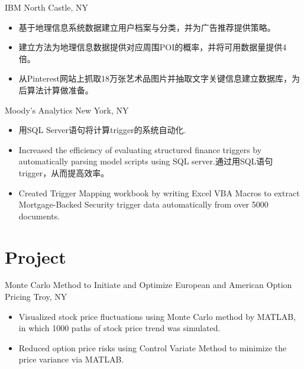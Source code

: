 \documentclass[11pt,a4paper,roman]{moderncv} %
\begin{document}
{IBM}
{North Castle, NY}{}
{\begin{itemize}  %
	\item 基于地理信息系统数据建立用户档案与分类，并为广告推荐提供策略。
	\item 建立方法为地理信息数据提供对应周围POI的概率，并将可用数据量提供4倍。
	\item 从Pinterest网站上抓取18万张艺术品图片并抽取文字关键信息建立数据库，为后算法计算做准备。
\end{itemize}}

{Moody's Analytics}
{New York, NY}{}
{\begin{itemize}  %
	\item 用SQL Server语句将计算trigger的系统自动化. %
	\item Increased the efficiency of evaluating structured finance triggers by automatically parsing model scripts using SQL server.通过用SQL语句trigger，从而提高效率。 %
	\item Created Trigger Mapping workbook by writing Excel VBA Macros to extract Mortgage-Backed Security trigger data automatically from over 5000 documents. %
\end{itemize}}



\section{Project}

{Monte Carlo Method to Initiate and Optimize European and American Option Pricing}
{Troy, NY}{}
{\begin{itemize}  %
    \item Visualized stock price fluctuations using Monte Carlo method by MATLAB, in which 1000 paths of stock price trend was simulated. %
    \item Reduced option price risks using Control Variate Method to minimize the price variance via MATLAB. %
\end{itemize}}
                
\end{document}
